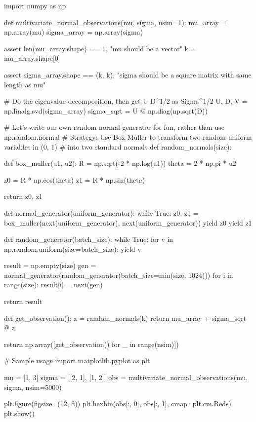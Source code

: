 \begin{python}
import numpy as np

def multivariate_normal_observations(mu, sigma, nsim=1):
    mu_array = np.array(mu)
    sigma_array = np.array(sigma)
    
    assert len(mu_array.shape) == 1, "mu should be a vector"
    k = mu_array.shape[0]
    
    assert sigma_array.shape == (k, k), "sigma should be a square matrix with same length as mu"
    
    # Do the eigenvalue decomposition, then get U D^{1/2} as Sigma^{1/2}
    U, D, V = np.linalg.svd(sigma_array)
    sigma_sqrt = U @ np.diag(np.sqrt(D))
    
    # Let's write our own random normal generator for fun, rather than use np.random.normal
    # Strategy: Use Box-Muller to transform two random uniform variables in (0, 1) 
    # into two standard normals
    def random_normals(size):

        def box_muller(u1, u2):
            R = np.sqrt(-2 * np.log(u1))
            theta = 2 * np.pi * u2

            z0 = R * np.cos(theta)
            z1 = R * np.sin(theta)

            return z0, z1

        def normal_generator(uniform_generator):
            while True:
                z0, z1 = box_muller(next(uniform_generator), next(uniform_generator))
                yield z0
                yield z1

        def random_generator(batch_size):
            while True:
                for v in np.random.uniform(size=batch_size):
                    yield v

        result = np.empty(size)
        gen = normal_generator(random_generator(batch_size=min(size, 1024)))
        for i in range(size):
            result[i] = next(gen)

        return result

    def get_observation():
        z = random_normals(k)
        return mu_array + sigma_sqrt @ z
    
    return np.array([get_observation() for _ in range(nsim)])
\end{python}

\begin{python}
# Sample usage
import matplotlib.pyplot as plt

mu = [1, 3]
sigma = [[2, 1], [1, 2]]
obs = multivariate_normal_observations(mu, sigma, nsim=5000)

plt.figure(figsize=(12, 8))
plt.hexbin(obs[:, 0], obs[:, 1], cmap=plt.cm.Reds)
plt.show()
\end{python}

